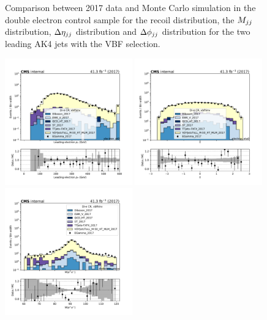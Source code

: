 \begin{figure}[htbp]
\begin{center}
    \end{center}
    \caption{Comparison between 2017 data and Monte Carlo simulation in the double electron control sample for
        the recoil distribution, the $M_{jj}$ distribution, $\Delta \eta_{jj}$ distribution and $\Delta \phi_{jj}$ distribution
        for the two leading AK4 jets with the VBF selection.}
    \label{fig:DE_vbfhinv_2017}
\end{figure}

\begin{figure}[htbp]
    \begin{center}
        \includegraphics[width=0.49\textwidth]{fig/datamc/cr_2e_vbf/cr_2e_vbf_electron_pt0_losf_2017.pdf}
        \includegraphics[width=0.49\textwidth]{fig/datamc/cr_2e_vbf/cr_2e_vbf_electron_eta0_losf_2017.pdf} \\
        \includegraphics[width=0.49\textwidth]{fig/datamc/cr_2e_vbf/cr_2e_vbf_dielectron_mass_losf_2017.pdf}

\end{center}
\end{figure}

